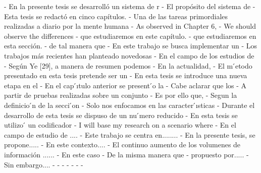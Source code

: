 - En la presente tesis se desarrolló un sistema de r
- El propósito del sistema de
- Esta tesis se redactó en cinco capítulos. 
- Una de las tareas primordiales realizadas a diario por la mente humana 
- As observed in Chapter 6, 
- We should observe the differences
- que estudiaremos en este capítulo.
- que estudiaremos en esta sección.
- de tal manera que 
- En este trabajo se busca implementar un 
- Los trabajos más recientes han planteado novedosas
- En el campo de los estudios de 
- Según Ye [29], a manera de resumen podemos
- En la actualidad,
- El m ́etodo presentado en esta tesis pretende ser un 
- En esta tesis se introduce una nueva etapa en el 
- En el cap ́ıtulo anterior se present ́o la
- Cabe aclarar que los 
- A partir de pruebas realizadas sobre un conjunto 
- Es por ello que,
- Segun la definicio ́n de la secci ́on
- Solo nos enfocamos en las caracter ́ısticas
- Durante el desarrollo de esta tesis se dispuso de un nu ́mero reducido 
- En esta tesis se utilizo ́ un codificador
- I will base my research on a scenario where
- En el campo de estudio de ....
- Este trabajo se centra en........
- En la presente tesis, se propone.....
- En este contexto....
- El continuo aumento de los volumenes de información ......
- En este caso
- De la misma manera que
- propuesto por.....
- Sin embargo....
- 
- 
- 
- 
- 
- 
- 


